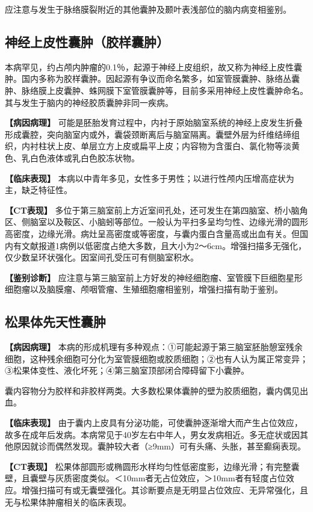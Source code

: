 应注意与发生于脉络膜裂附近的其他囊肿及颞叶表浅部位的脑内病变相鉴别。

\subsection{神经上皮性囊肿（胶样囊肿）}

本病罕见，约占颅内肿瘤的0.1％，起源于神经上皮组织，故又称为神经上皮性囊肿。国内多称为胶样囊肿。因起源有争议而命名繁多，如室管膜囊肿、脉络丛囊肿、脉络膜上皮囊肿、蛛网膜下室管膜囊肿等，目前多采用神经上皮性囊肿命名。其与发生于脑内的神经胶质囊肿非同一疾病。

\textbf{【病因病理】}
可能是胚胎发育过程中，内衬于原始脑室系统的神经上皮发生折叠形成囊腔，突向脑室内或外，囊袋颈断离后与脑室隔离。囊壁外层为纤维结缔组织，内衬柱状上皮、单层立方上皮或扁平上皮；内容物为含蛋白、氯化物等淡黄色、乳白色液体或乳白色胶冻状物。

\textbf{【临床表现】}
本病以中青年多见，女性多于男性；以进行性颅内压增高症状为主，缺乏特征性。

\textbf{【CT表现】}
多位于第三脑室前上方近室间孔处，还可发生在第四脑室、桥小脑角区、侧脑室以及鞍区、小脑蚓等部位。一般认为平扫多呈均匀性、边缘光滑的圆形高密度，边缘光滑。病灶呈高密度或等密度，与囊内蛋白含量高或出血有关。但国内有文献报道1病例以低密度占绝大多数，且大小为2～6cm。增强扫描多无强化，仅少数呈环状强化。因室间孔受压可有侧脑室积水。

\textbf{【鉴别诊断】}
应注意与第三脑室前上方好发的神经细胞瘤、室管膜下巨细胞星形细胞瘤以及脑膜瘤、颅咽管瘤、生殖细胞瘤相鉴别，增强扫描有助于鉴别。

\subsection{松果体先天性囊肿}

\textbf{【病因病理】}
本病的形成机理有多种观点：①可能起源于第三脑室胚胎憩室残余细胞，这种残余细胞可分化为室管膜细胞或胶质细胞；②也有人认为属正常变异；③松果体变性、液化坏死；④第三脑室顶部闭合障碍留下小囊肿。

囊内容物分为胶样和非胶样两类。大多数松果体囊肿的壁为胶质细胞，囊内偶见出血。

\textbf{【临床表现】}
由于囊内上皮具有分泌功能，可使囊肿逐渐增大而产生占位效应，故多在成年后发病。本病常见于40岁左右中年人，男女发病相近。多无症状或因其他原因就诊而偶然发现。囊肿较大者（≥9mm）可有头痛、头胀，甚至癫痫表现。

\textbf{【CT表现】}
松果体部圆形或椭圆形水样均匀性低密度影，边缘光滑；有完整囊壁，且囊壁与灰质密度类似。＜10mm者无占位效应，＞10mm者有轻度占位效应。增强扫描可有或无囊壁强化。其诊断要点是无明显占位效应、无异常强化，且无与松果体肿瘤相关的临床表现。

